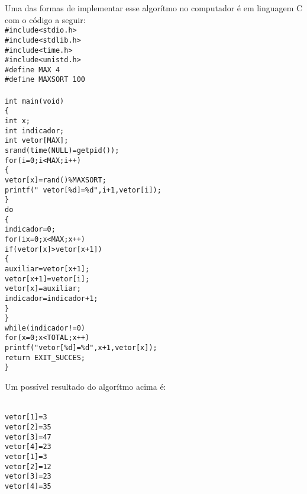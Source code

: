 \documentclass[11pts]{book}
\begin{document}
Uma das formas de implementar esse algorítmo no computador é em linguagem C com o código a seguir:
\newpage
\texttt{ \\
\#include<stdio.h>\\
 \#include<stdlib.h> \\ 
\#include<time.h>\\
\#include<unistd.h>\\
\#define MAX 4\\
\#define MAXSORT 100 \\ \\
int main(void) \\
\{ \\
 int x;\\
int indicador;\\ 
int vetor[MAX];\\
srand(time(NULL)=getpid());\\ 
for(i=0;i<MAX;i++)\\
\{ \\
vetor[x]=rand()\%MAXSORT;\\
printf(" vetor[\%d]=\%d",i+1,vetor[i]); \\
\} \\
do \\
\{  \\
indicador=0; \\
for(ix=0;x<MAX;x++)\\
if(vetor[x]>vetor[x+1])\\
\{ \\
auxiliar=vetor[x+1];\\
vetor[x+1]=vetor[i];\\
vetor[x]=auxiliar;\\
indicador=indicador+1;\\
\} \\
\} \\
while(indicador!=0) \\
for(x=0;x<TOTAL;x++) \\
printf("vetor[\%d]=\%d",x+1,vetor[x]); \\
return EXIT\_SUCCES; \\
\}
}

\newpage

Um possível resultado do algorítmo acima é:

\texttt{\\
vetor[1]=3 \\
vetor[2]=35 \\
vetor[3]=47 \\
vetor[4]=23 \\
vetor[1]=3 \\
vetor[2]=12 \\
vetor[3]=23 \\
vetor[4]=35 \\
}
\end{document}
